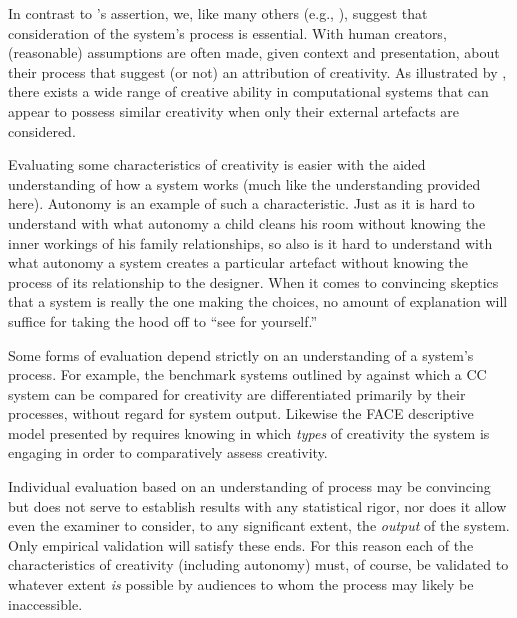 \documentclass[phd,electronic,oneside,twosidetoc,letterpaper,chaptercenter,parttop,lof,lot]{byumsphd}
\begin{document}
In contrast to \citeauthor{Ritchie2007}'s assertion, we, like many others (e.g., \cite{kasof1995explaining, Boden2003TheEdition, colton2008creativity}), suggest that consideration of the system's process is essential. With human creators, (reasonable) assumptions are often made, given context and presentation, about their process that suggest (or not) an attribution of creativity. As illustrated by \citeauthor{Ventura2016} \cite{Ventura2016}, there exists a wide range of creative ability in computational systems that can appear to possess similar creativity when only their external artefacts are considered.

Evaluating some characteristics of creativity is easier with the aided understanding of how a system works (much like the understanding provided here). Autonomy is an example of such a characteristic. Just as it is hard to understand with what autonomy a child cleans his room without knowing the inner workings of his family relationships, so also is it hard to understand with what autonomy a system creates a particular artefact without knowing the process of its relationship to the designer. When it comes to convincing skeptics that a system is really the one making the choices, no amount of explanation will suffice for taking the hood off to ``see for yourself.'' 

Some forms of evaluation depend strictly on an understanding of a system's process. For example, the benchmark systems outlined by \citeauthor{Ventura2016} \cite{Ventura2016} against which a CC system can be compared for creativity are differentiated primarily by their processes, without regard for system output. Likewise the FACE descriptive model presented by \citeauthor{Colton2011} \cite{Colton2011} requires knowing in which \textit{types} of creativity the system is engaging in order to comparatively assess creativity. 

Individual evaluation based on an understanding of process may be convincing but does not serve to establish results with any statistical rigor, nor does it allow even the examiner to consider, to any significant extent, the \textit{output} of the system. Only empirical validation will satisfy these ends. For this reason each of the characteristics of creativity (including autonomy) must, of course, be validated to whatever extent \textit{is} possible by audiences to whom the process may likely be inaccessible.
\end{document}
